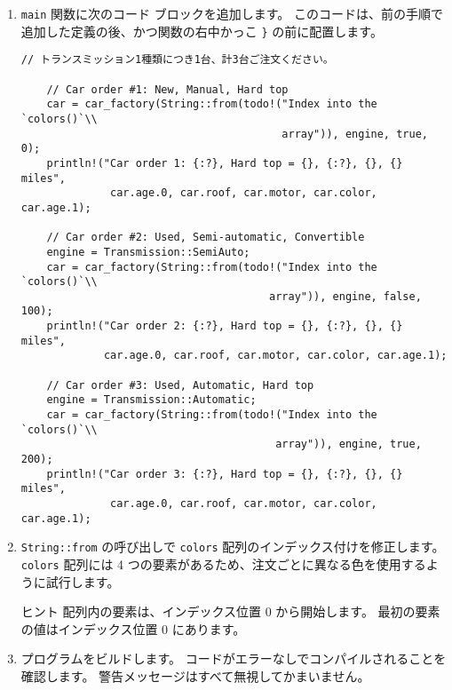 \begin{enumerate}

\item \texttt{main} 関数に次のコード ブロックを追加します。 このコードは、前の手順で追加した定義の後、かつ関数の右中かっこ \texttt{\}} の前に配置します。


\begin{lstlisting}[numbers=none]
    // トランスミッション1種類につき1台、計3台ご注文ください。

    // Car order #1: New, Manual, Hard top
    car = car_factory(String::from(todo!("Index into the `colors()`\\
                                         array")), engine, true, 0);
    println!("Car order 1: {:?}, Hard top = {}, {:?}, {}, {} miles",
              car.age.0, car.roof, car.motor, car.color, car.age.1);

    // Car order #2: Used, Semi-automatic, Convertible
    engine = Transmission::SemiAuto;
    car = car_factory(String::from(todo!("Index into the `colors()`\\
                                       array")), engine, false, 100);
    println!("Car order 2: {:?}, Hard top = {}, {:?}, {}, {} miles",
             car.age.0, car.roof, car.motor, car.color, car.age.1);

    // Car order #3: Used, Automatic, Hard top
    engine = Transmission::Automatic;
    car = car_factory(String::from(todo!("Index into the `colors()`\\
                                        array")), engine, true, 200);
    println!("Car order 3: {:?}, Hard top = {}, {:?}, {}, {} miles",
              car.age.0, car.roof, car.motor, car.color, car.age.1);
\end{lstlisting}


\item \texttt{String::from} の呼び出しで \texttt{colors} 配列のインデックス付けを修正します。 \texttt{colors} 配列には 4 つの要素があるため、注文ごとに異なる色を使用するように試行します。

\begin{itembox}[l]{ヒント}
配列内の要素は、インデックス位置 0 から開始します。 最初の要素の値はインデックス位置 0 にあります。
\end{itembox}

\item プログラムをビルドします。 コードがエラーなしでコンパイルされることを確認します。 警告メッセージはすべて無視してかまいません。

\end{enumerate}

